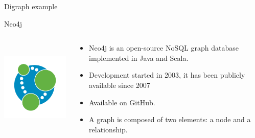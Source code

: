 \begin{frame}{Digraph example}
  \begin{center}
  \end{center}
\end{frame}

\begin{frame}{Neo4j}
    \begin{columns}
      \begin{column}{0.25\textwidth}
        \includegraphics[height=1.8in]{img/neo4j.png}
      \end{column}
      \begin{column}{0.6\textwidth}
        \begin{itemize}
          \item Neo4j is an open-source NoSQL graph database implemented in Java and Scala.
          \vspace{0.25cm}
          \item Development started in 2003, it has been publicly available since 2007
          \vspace{0.25cm}
          \item Available on GitHub.
          \vspace{0.25cm}
          \item A graph is composed of two elements: a node and a relationship.
        \end{itemize}
      \end{column}
    \end{columns}
\end{frame}



